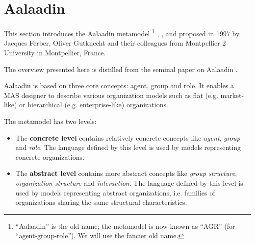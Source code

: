 
\section{Aalaadin}

This section introduces the Aalaadin metamodel
\footnote{``Aalaadin'' is the old name; the metamodel is now known as ``AGR'' (for ``agent-group-role''). We will use the fancier old name.}
\cite{Ferber97}, \cite{Ferber98}, \cite{Ferber00} and \cite{Ferber03}
proposed in 1997 by Jacques Ferber, Oliver Gutknecht and their colleagues from Montpellier 2 University in Montpellier, France.

The overview presented here is distilled from the seminal paper on Aalaadin \cite{Ferber97}.


Aalaadin is based on three core concepts: agent, group and role.
It enables a MAS designer to describe various organization models such as flat (e.g. market-like) or hierarchical (e.g. enterprise-like) organizations.

The metamodel has two levels:
\begin{itemize}
	\item The \textbf{concrete level} contains relatively concrete concepts like \textit{agent}, \textit{group} and \textit{role}.
	The language defined by this level is used by models representing concrete organizations.
	\item The \textbf{abstract level} contains more abstract concepts like \textit{group structure}, \textit{organization structure} and \textit{interaction}. 
	The language defined by this level is used by models representing abstract organizations, i.e. families of organizations sharing the same structural characteristics.
\end{itemize}

